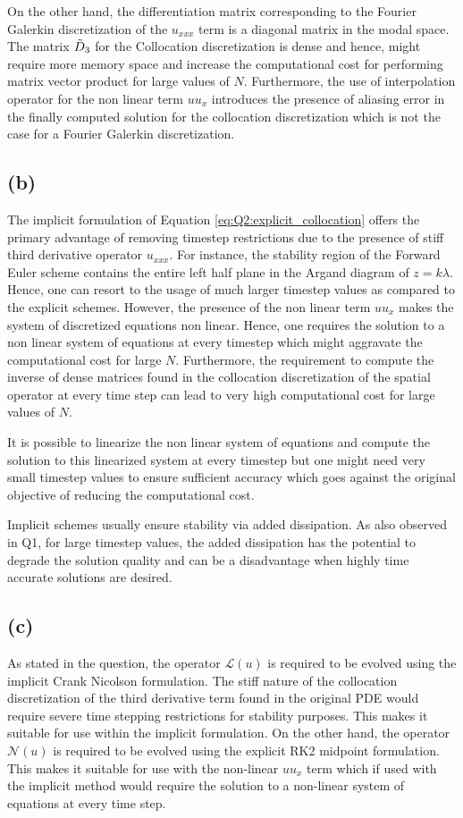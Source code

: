 \documentclass[12pt,dvipsnames]{article}
\begin{document}
On the other hand, the differentiation matrix corresponding to the Fourier Galerkin discretization of the $u_{xxx}$ term is a diagonal matrix in the modal space. The matrix $\Tilde{D}_3$ for the Collocation discretization is dense and hence, might require more memory space and increase the computational cost for performing matrix vector product for large values of $N$. Furthermore, the use of interpolation operator for the non linear term $uu_x$ introduces the presence of aliasing error in the finally computed solution for the collocation discretization which is not the case for a Fourier Galerkin discretization.

\subsection{(b)}
The implicit formulation of Equation \ref{eq:Q2:explicit_collocation} offers the primary advantage of removing timestep restrictions due to the presence of stiff third derivative operator $u_{xxx}$. For instance, the stability region of the Forward Euler scheme contains the entire left half plane in the Argand diagram of $z = k \lambda$. Hence, one can resort to the usage of much larger timestep values as compared to the explicit schemes. However, the presence of the non linear term $uu_x$ makes the system of discretized equations non linear. Hence, one requires the solution to a non linear system of equations at every timestep which might aggravate the computational cost for large $N$. Furthermore, the requirement to compute the inverse of dense matrices found in the collocation discretization of the spatial operator at every time step can lead to very high computational cost for large values of $N$. 

It is possible to linearize the non linear system of equations and compute the solution to this linearized system at every timestep but one might need very small timestep values to ensure sufficient accuracy which goes against the original objective of reducing the computational cost. 

Implicit schemes usually ensure stability via added dissipation. As also observed in Q1, for large timestep values, the added dissipation has the potential to degrade the solution quality and can be a disadvantage when highly time accurate solutions are desired. 
\subsection{(c)}
As stated in the question, the operator $\mathcal{L}(u)$ is required to be evolved using the implicit Crank Nicolson formulation. The stiff nature of the collocation discretization of the third derivative term found in the original PDE would require severe time stepping restrictions for stability purposes. This makes it suitable for use within the implicit formulation. On the other hand, the operator $\mathcal{N}(u)$ is required to be evolved using the explicit RK2 midpoint formulation. This makes it suitable for use with the non-linear $uu_x$ term which if used with the implicit method would require the solution to a non-linear system of equations at every time step. 
\end{document}
